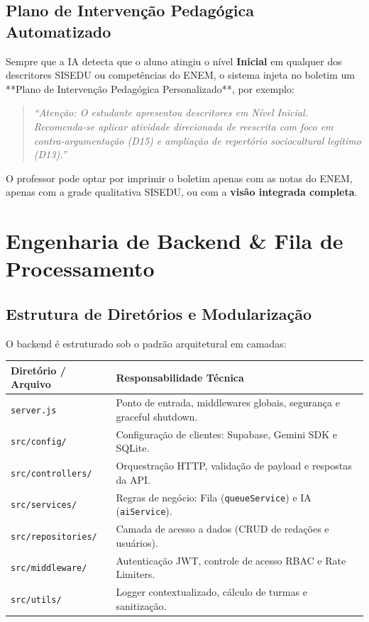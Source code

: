 \documentclass[11pt,a4paper]{article}
\begin{document}
\subsection{Plano de Intervenção Pedagógica Automatizado}
Sempre que a IA detecta que o aluno atingiu o nível \textbf{Inicial} em qualquer dos descritores SISEDU ou competências do ENEM, o sistema injeta no boletim um **Plano de Intervenção Pedagógica Personalizado**, por exemplo:
\begin{quote}
\small\sffamily\textit{``Atenção: O estudante apresentou descritores em Nível Inicial. Recomenda-se aplicar atividade direcionada de reescrita com foco em contra-argumentação (D15) e ampliação de repertório sociocultural legítimo (D13).''}
\end{quote}

O professor pode optar por imprimir o boletim apenas com as notas do ENEM, apenas com a grade qualitativa SISEDU, ou com a \textbf{visão integrada completa}.

\section{Engenharia de Backend \& Fila de Processamento}

\subsection{Estrutura de Diretórios e Modularização}
O backend é estruturado sob o padrão arquitetural em camadas:

\begin{center}
\begin{tabularx}{\textwidth}{l p{10cm}}
\toprule
\textbf{Diretório / Arquivo} & \textbf{Responsabilidade Técnica} \\
\midrule
\texttt{server.js} & Ponto de entrada, middlewares globais, segurança e graceful shutdown. \\
\texttt{src/config/} & Configuração de clientes: Supabase, Gemini SDK e SQLite. \\
\texttt{src/controllers/} & Orquestração HTTP, validação de payload e respostas da API. \\
\texttt{src/services/} & Regras de negócio: Fila (\texttt{queueService}) e IA (\texttt{aiService}). \\
\texttt{src/repositories/} & Camada de acesso a dados (CRUD de redações e usuários). \\
\texttt{src/middleware/} & Autenticação JWT, controle de acesso RBAC e Rate Limiters. \\
\texttt{src/utils/} & Logger contextualizado, cálculo de turmas e sanitização. \\
\bottomrule
\end{tabularx}
\end{center}
\end{document}
